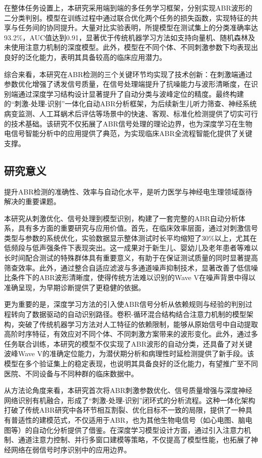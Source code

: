 在整体任务设置上，本研究采用端到端的多任务学习框架，分别实现ABR波形的二分类判别。模型在训练过程中通过联合优化两个任务的损失函数，实现特征的共享与任务间的协同提升。大量对比实验表明，所提模型在测试集上的分类准确率达93.2\%，AUC值达到0.91，显著优于传统机器学习方法如支持向量机、随机森林及未使用注意力机制的深度模型。此外，模型在不同个体、不同刺激参数下均表现出良好的泛化能力，表明其具备较高的临床应用潜力。

综合来看，本研究在ABR检测的三个关键环节均实现了技术创新：在刺激端通过参数优化增强了诱发信号质量，在信号处理端提升了抗噪能力与波形清晰度，在识别端通过深度学习结构设计显著提升了自动分类与波峰定位的精度。最终构建的“刺激-处理-识别”一体化自动ABR分析框架，为后续新生儿听力筛查、神经系统病变监测、人工耳蜗术后评估等场景中的快速、客观、标准化检测提供了切实可行的技术基础。该研究不仅拓展了ABR信号处理的理论边界，也为深度学习在生物电信号智能分析中的应用提供了典范，为实现临床ABR全流程智能化提供了关键支撑。

\subsection*{研究意义}

提升ABR检测的准确性、效率与自动化水平，是听力医学与神经电生理领域亟待解决的重要课题。

本研究从刺激优化、信号处理到模型识别，构建了一套完整的ABR自动分析体系，具有多方面的重要研究与应用价值。首先，在临床效率层面，通过对刺激信号类型与参数的系统优化，实验数据显示整体测试时长平均缩短了30\%以上，尤其在低频段与低声强条件下表现突出。这一成果对于新生儿、婴幼儿及老年患者等难以长时间配合测试的特殊群体具有重要意义，有助于在保证测试质量的同时显著提高筛查效率。此外，通过整合自适应滤波与多通道噪声抑制技术，显著改善了低信噪比条件下的ABR波形清晰度，使得传统方法难以识别的Wave V在噪声背景中得以准确呈现，为早期诊断提供了更稳健的依据。

更为重要的是，深度学习方法的引入使ABR信号分析从依赖规则与经验的判别过程转向了数据驱动的自动识别路径。卷积-循环混合结构结合注意力机制的模型架构，突破了传统机器学习方法对人工特征的依赖限制，能够从原始信号中自动提取高阶时序特征，有效应对不同个体、不同刺激方案带来的波形变化。此外，通过多任务联合训练，本研究的模型不仅实现了ABR波形的自动分类，还具备了对关键波峰Wave V的准确定位能力，为潜伏期分析和病理性时延检测提供了新手段。该模型在多个验证集上的稳定表现，也说明其具备良好的泛化能力，有望推广至不同医院、不同设备与不同种群的临床数据中。

从方法论角度来看，本研究首次将ABR刺激参数优化、信号质量增强与深度神经网络识别有机融合，形成了“刺激-处理-识别”闭环式的分析流程。这种一体化架构打破了传统ABR研究中各环节相互割裂、优化目标不一致的局限，提供了一种具有普适性的建模范式，不仅适用于ABR，也为其他生物电信号（如心电图、脑电图等）的自动化分析提供了借鉴。在深度学习模型设计方面，通过引入注意力机制、通道注意力控制、并行多窗口建模等策略，不仅提高了模型性能，也拓展了神经网络在弱信号时序识别中的应用边界。

